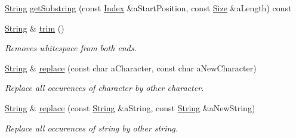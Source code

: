 \begin{DoxyCompactItemize}
\item 
\hyperlink{classlibrary_1_1core_1_1types_1_1_string}{String} \hyperlink{classlibrary_1_1core_1_1types_1_1_string_aaf9377048b900766d05a1af9182cf251}{get\+Substring} (const \hyperlink{namespacelibrary_1_1core_1_1types_ad87eeb821d7067ec94e06ed1980d6350}{Index} \&a\+Start\+Position, const \hyperlink{namespacelibrary_1_1core_1_1types_a701626ea1027888ebbb8cfd0ff7adab0}{Size} \&a\+Length) const
\item 
\hyperlink{classlibrary_1_1core_1_1types_1_1_string}{String} \& \hyperlink{classlibrary_1_1core_1_1types_1_1_string_a42426ffb11bb0b2789ba0991064a01b5}{trim} ()
\begin{DoxyCompactList}\small\item\em Removes whitespace from both ends. \end{DoxyCompactList}\item 
\hyperlink{classlibrary_1_1core_1_1types_1_1_string}{String} \& \hyperlink{classlibrary_1_1core_1_1types_1_1_string_a8d4100938450cb4c4bba2c3e49d1871d}{replace} (const char a\+Character, const char a\+New\+Character)
\begin{DoxyCompactList}\small\item\em Replace all occurences of character by other character. \end{DoxyCompactList}\item 
\hyperlink{classlibrary_1_1core_1_1types_1_1_string}{String} \& \hyperlink{classlibrary_1_1core_1_1types_1_1_string_a33f558b912c1f24a109e985c3a180f22}{replace} (const \hyperlink{classlibrary_1_1core_1_1types_1_1_string}{String} \&a\+String, const \hyperlink{classlibrary_1_1core_1_1types_1_1_string}{String} \&a\+New\+String)
\begin{DoxyCompactList}\small\item\em Replace all occurences of string by other string. \end{DoxyCompactList}\end{DoxyCompactItemize}
